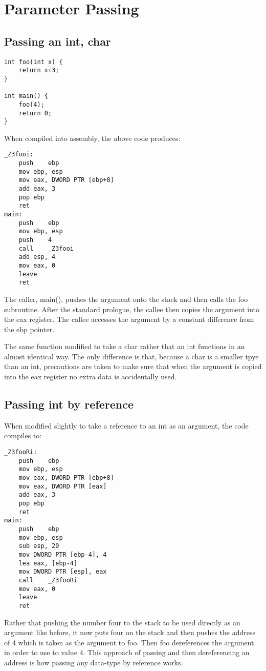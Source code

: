 \documentclass{article}
\begin{document}
\section{Parameter Passing}
\subsection{Passing an int, char}
\begin{lstlisting}
int foo(int x) {
    return x+3;
}

int main() {
    foo(4);
    return 0;
}
\end{lstlisting}
When compiled into assembly, the above code produces:
\begin{lstlisting}
_Z3fooi:
	push	ebp
	mov	ebp, esp
	mov	eax, DWORD PTR [ebp+8]
	add	eax, 3
	pop	ebp
	ret
main:
	push	ebp
	mov	ebp, esp
	push	4
	call	_Z3fooi
	add	esp, 4
	mov	eax, 0
	leave
	ret
\end{lstlisting}
The caller, main(), pushes the argument onto the stack and then calls the foo subroutine. After the standard prologue, the callee then copies the argument into the eax register. The callee accesses the argument by a constant difference from the ebp pointer.

The same function modified to take a char rather that an int functions in an almost identical way. The only difference is that, because a char is a smaller tpye than an int, precautions are taken to make sure that when the argument is copied into the eax register no extra data is accidentally used. 

\subsection{Passing int by reference}
When modified slightly to take a reference to an int as an argument, the code compiles to:
\begin{lstlisting}
_Z3fooRi:
	push	ebp
	mov	ebp, esp
	mov	eax, DWORD PTR [ebp+8]
	mov	eax, DWORD PTR [eax]
	add	eax, 3
	pop	ebp
	ret
main:
	push	ebp
	mov	ebp, esp
	sub	esp, 20
	mov	DWORD PTR [ebp-4], 4
	lea	eax, [ebp-4]
	mov	DWORD PTR [esp], eax
	call	_Z3fooRi
	mov	eax, 0
	leave
	ret
\end{lstlisting}
Rather that pushing the number four to the stack to be used directly as an argument like before, it now puts four on the stack and then pushes the address of 4 which is taken as the argument to foo. Then foo dereferences the argument in order to use to value 4. This approach of passing and then dereferencing an address is how passing any data-type by reference works.
\end{document}
